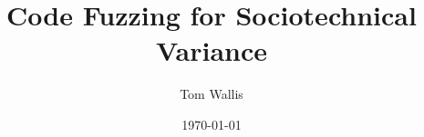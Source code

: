 \documentclass[a4paper]{l4proj}
\begin{document}
\title{Code Fuzzing for Sociotechnical Variance}  %
\author{Tom Wallis}
\date{\today}
\maketitle



\educationalconsent
\tableofcontents










%



\end{document}
